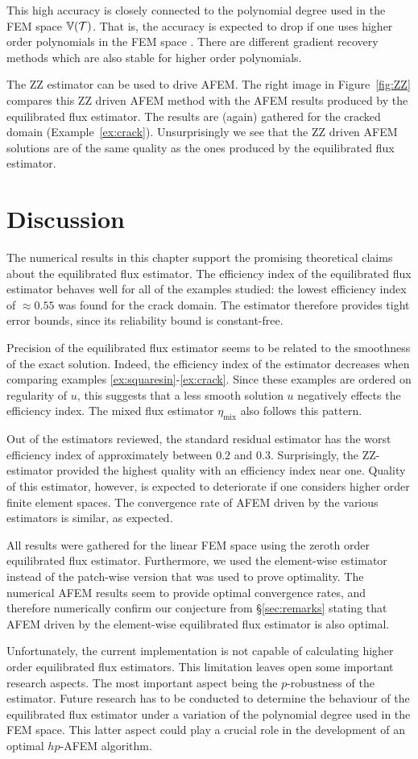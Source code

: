 \documentclass[thesis.tex]{subfiles}
\begin{document}
This high accuracy is closely
connected to the polynomial degree used in the FEM space $\mathbb{V}(\mathcal{T})$. That is, the accuracy
is expected to drop if one uses higher order polynomials in the FEM space \cite{bartels2002each}.
There are different gradient recovery methods which are also stable for higher order polynomials.

The ZZ estimator can be used to drive AFEM. The right image in Figure~\ref{fig:ZZ} compares this ZZ driven AFEM method
with the AFEM results produced by the equilibrated flux estimator. The results are (again) gathered for the cracked domain 
(Example~\ref{ex:crack}). Unsurprisingly we see that the ZZ driven AFEM solutions are of the same quality as the ones produced by the
equilibrated flux estimator. 


\section{Discussion}
The numerical results in this chapter support the promising theoretical claims about the equilibrated flux estimator.
The efficiency index of the equilibrated flux estimator behaves well for all of the examples studied:
the lowest efficiency index of $\approx 0.55$ was found for the crack domain.
The estimator therefore provides tight error bounds, since its reliability bound is constant-free. 

Precision of the equilibrated flux estimator seems to be related to the smoothness of the exact solution. Indeed, the efficiency
index of the estimator decreases when comparing examples \ref{ex:squaresin}-\ref{ex:crack}.
Since these examples are ordered on regularity of $u$, this suggests that a less smooth solution $u$ negatively
effects the efficiency index. The mixed flux estimator $\eta_{\text{mix}}$ also follows this pattern.

Out of the estimators reviewed, the standard residual estimator has the worst efficiency index of approximately between $0.2$ and $0.3$.
Surprisingly, the ZZ-estimator provided the highest quality with an efficiency index near one. Quality of this estimator, however, is expected
to deteriorate if one considers higher order finite element spaces.
The convergence rate of AFEM driven by the various estimators is similar, as expected.

All results were gathered for the linear FEM space using the zeroth order equilibrated flux estimator. 
Furthermore, we used the element-wise estimator instead of the patch-wise version that was used to prove optimality. 
The numerical AFEM results
seem to provide optimal convergence rates, and therefore numerically confirm our conjecture from \S\ref{sec:remarks} stating
that AFEM driven by the element-wise equilibrated flux estimator is also optimal.

Unfortunately, the current implementation is not capable of calculating higher order equilibrated flux estimators. This limitation
leaves open some important research aspects. The most important aspect being the $p$-robustness of the estimator.
Future research has to be conducted to determine the behaviour
 of the equilibrated flux estimator under a variation of the polynomial degree used in the FEM space. 
This latter aspect could play a crucial role in the development of an optimal $hp$-AFEM algorithm.
\end{document}
